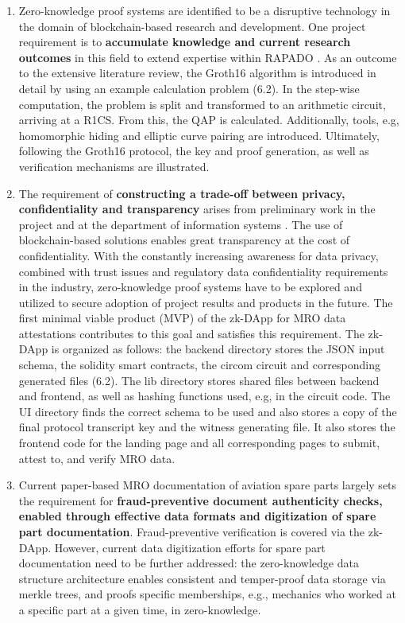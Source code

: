 \begin{enumerate}
    \item Zero-knowledge proof systems are identified to be a disruptive technology in the domain of blockchain-based research and development. One project requirement is to \textbf{accumulate knowledge and current research outcomes} in this field to extend expertise within RAPADO \citep{ZedelJ}. As an outcome to the extensive literature review, the Groth16 algorithm is introduced in detail by using an example calculation problem (6.2). In the step-wise computation, the problem is split and transformed to an arithmetic circuit, arriving at a R1CS. From this, the QAP is calculated. Additionally, tools, e.g, homomorphic hiding and elliptic curve pairing are introduced. Ultimately, following the Groth16 protocol, the key and proof generation, as well as verification mechanisms are illustrated.
    \item The requirement of \textbf{constructing a trade-off between privacy, confidentiality and transparency} arises from preliminary work in the project and at the department of information systems \citep{FornaconFrank, ZedelJ}. The use of blockchain-based solutions enables great transparency at the cost of confidentiality. With the constantly increasing awareness for data privacy, combined with trust issues and regulatory data confidentiality requirements in the industry, zero-knowledge proof systems have to be explored and utilized to secure adoption of project results and products in the future. The first minimal viable product (MVP) of the zk-DApp for MRO data attestations contributes to this goal and satisfies this requirement. The zk-DApp is organized as follows: the backend directory stores the JSON input schema, the solidity smart contracts, the circom circuit and corresponding generated files (6.2). The lib directory stores shared files between backend and frontend, as well as hashing functions used, e.g, in the circuit code. The UI directory finds the correct schema to be used and also stores a copy of the final protocol transcript key and the witness generating file. It also stores the frontend code for the landing page and all corresponding pages to submit, attest to, and verify MRO data.
    \item Current paper-based MRO documentation of aviation spare parts largely sets the requirement for \textbf{fraud-preventive document authenticity checks, enabled through effective data formats and digitization of spare part documentation}. Fraud-preventive verification is covered via the zk-DApp. However, current data digitization efforts for spare part documentation need to be further addressed: the zero-knowledge data structure architecture enables consistent and temper-proof data storage via merkle trees, and proofs specific memberships, e.g., mechanics who worked at a specific part at a given time, in zero-knowledge.
\end{enumerate}

